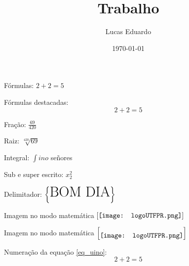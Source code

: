 \documentclass[12pt,a4paper]{article}
\author{Lucas Eduardo}
\date{\today}
\title{Trabalho}
\begin{document}
	\maketitle
	
	Fórmulas: $2 + 2 = 5$

	Fórmulas destacadas: $$2 + 2 = 5$$
	
	Fração: $\frac{69}{420}$
	
	Raiz: $\sqrt[420]{69}$
	
	Integral: $\int{ino}$  señores
	
	Sub e super escrito: $x_2^2$
	
	Delimitador: $\left\{ \mbox{\huge BOM DIA} \right\}$


	Imagem no modo matemática $
	\left[{\text{\texttt{[image: logoUTFPR.png]}}}\right]
	$
	
	Imagem no modo matemática $
	\left[\raisebox{-0.5\height}{\texttt{[image: logoUTFPR.png]}}\right]
	$
	
	
	Numeração da equação \ref{eq_uino}: 
	\begin{equation}
		2 + 2 = 5
		\label{eq_uino}
	\end{equation}
	
\end{document}
